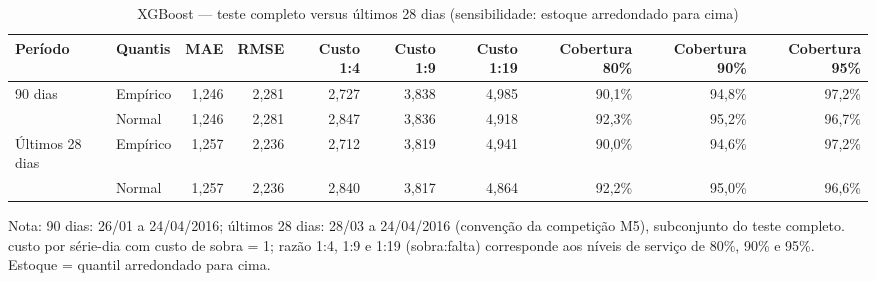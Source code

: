 \begin{table}[htbp]
\centering
\small
\caption{XGBoost — teste completo versus últimos 28 dias (sensibilidade: estoque arredondado para cima)}
\label{tab:xgb_verificacao_28d_sensibilidade}
\begin{tabular}{llrrrrrrrr}
\toprule
Período & Quantis & MAE & RMSE & Custo 1:4 & Custo 1:9 & Custo 1:19 & Cobertura 80\% & Cobertura 90\% & Cobertura 95\% \\
\midrule
90 dias & Empírico & 1,246 & 2,281 & 2,727 & 3,838 & 4,985 & 90,1\% & 94,8\% & 97,2\% \\
 & Normal & 1,246 & 2,281 & 2,847 & 3,836 & 4,918 & 92,3\% & 95,2\% & 96,7\% \\
\addlinespace
Últimos 28 dias & Empírico & 1,257 & 2,236 & 2,712 & 3,819 & 4,941 & 90,0\% & 94,6\% & 97,2\% \\
 & Normal & 1,257 & 2,236 & 2,840 & 3,817 & 4,864 & 92,2\% & 95,0\% & 96,6\% \\
\bottomrule
\end{tabular}
\par\smallskip
{\footnotesize Nota: 90 dias: 26/01 a 24/04/2016; últimos 28 dias: 28/03 a 24/04/2016 (convenção da competição M5), subconjunto do teste completo. custo por série-dia com custo de sobra = 1; razão 1:4, 1:9 e 1:19 (sobra:falta) corresponde aos níveis de serviço de 80\%, 90\% e 95\%. Estoque = quantil arredondado para cima.}
\end{table}
